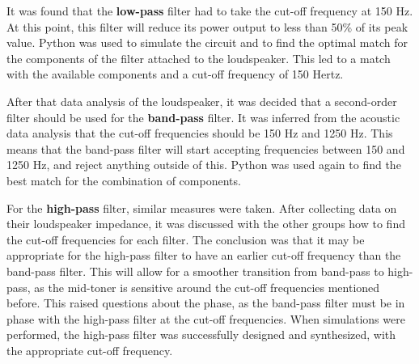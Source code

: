 It was found that the \textbf{low-pass} filter had to take the cut-off frequency at 150 Hz. At this point, this filter will reduce its power output to less than 50\% of its peak value. Python was used to simulate the circuit and to find the optimal match for the components of the filter attached to the loudspeaker. This led to a match with the available components and a cut-off frequency of 150 Hertz.

After that data analysis of the loudspeaker, it was decided that a second-order filter should be used for the \textbf{band-pass} filter. It was inferred from the acoustic data analysis that the cut-off frequencies should be 150 Hz and 1250 Hz. This means that the band-pass filter will start accepting frequencies between 150 and 1250 Hz, and reject anything outside of this. Python was used again to find the best match for the combination of components.

For the \textbf{high-pass} filter, similar measures were taken. After collecting data on their loudspeaker impedance, it was discussed with the other groups how to find the cut-off frequencies for each filter. The conclusion was that it may be appropriate for the high-pass filter to have an earlier cut-off frequency than the band-pass filter. This will allow for a smoother transition from band-pass to high-pass, as the mid-toner is sensitive around the cut-off frequencies mentioned before. This raised questions about the phase, as the band-pass filter must be in phase with the high-pass filter at the cut-off frequencies. When simulations were performed, the high-pass filter was successfully designed and synthesized, with the appropriate cut-off frequency.

